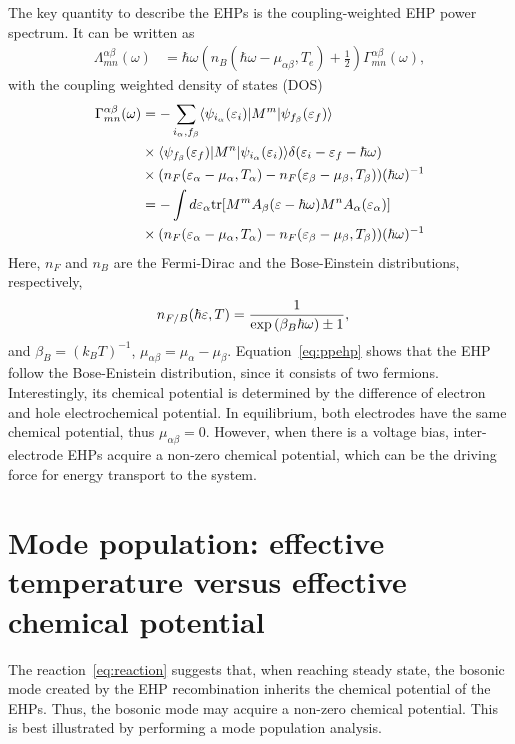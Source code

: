 \documentclass[aps
,floatfix,footinbib,
preprint
]{revtex4-1}
\begin{document}
\begin{figure}
	\label{fig:ehp}
\end{figure}

The key quantity to describe the EHPs is the coupling-weighted EHP power spectrum. It can be written as
\begin{align}
\Lambda_{mn}^{\alpha\beta}(\omega) &= \hbar\omega\left(n_B(\hbar\omega-\mu_{\alpha\beta},T_e)+\frac{1}{2}\right)\Gamma_{mn}^{\alpha\beta}(\omega),
\label{eq:ppehp}
\end{align}
with the coupling weighted density of states (DOS)
\begin{align}
\Gamma_{mn}^{\alpha\beta}(\omega) &= -\sum_{i_\alpha,f_\beta}\langle \psi_{i_\alpha}(\varepsilon_i)|M^{m}|\psi_{f_\beta}(\varepsilon_f)\rangle\\
&\times\langle\psi_{f_\beta}(\varepsilon_f)|M^{n}|\psi_{i_\alpha}(\varepsilon_i)\rangle \delta(\varepsilon_i-\varepsilon_f-\hbar\omega)\nonumber\\
&\times (n_F(\varepsilon_\alpha-\mu_\alpha,T_\alpha)-n_F(\varepsilon_\beta-\mu_\beta,T_\beta))(\hbar\omega)^{-1}\nonumber\\
&=-\int d\varepsilon_\alpha {\rm tr}[M^m A_\beta(\varepsilon-\hbar\omega)M^n A_\alpha(\varepsilon_\alpha)] \nonumber\\
&\times (n_F(\varepsilon_\alpha-\mu_\alpha,T_\alpha)-n_F(\varepsilon_\beta-\mu_\beta,T_\beta))(\hbar\omega)^{-1}
\end{align}
Here, $n_{F}$ and $n_B$ are the Fermi-Dirac and the Bose-Einstein distributions, respectively,
\begin{align}
n_{F/B}(\hbar\varepsilon,T) &= \frac{1}{{\rm exp}\left(\beta_B \hbar\omega\right)\pm 1},
\end{align}
and $\beta_B=(k_BT)^{-1}$, $\mu_{\alpha\beta}=\mu_\alpha-\mu_\beta$.
Equation~\ref{eq:ppehp} shows that the EHP follow the Bose-Enistein distribution, since it consists of two fermions. Interestingly, its chemical potential is determined by the difference of electron and hole electrochemical potential. In equilibrium, both electrodes have the same chemical potential, thus $\mu_{\alpha\beta}=0$. However, when there is a voltage bias, inter-electrode EHPs acquire a non-zero chemical potential, which can be the driving force for energy transport to the system.


\section{Mode population: effective temperature versus effective chemical potential}
The reaction~\ref{eq:reaction} suggests that, when reaching steady state, the bosonic mode created by the EHP recombination inherits the chemical potential of the EHPs. Thus, the bosonic mode may acquire a non-zero chemical potential. This is best illustrated by performing a mode population analysis. 
\end{document}
